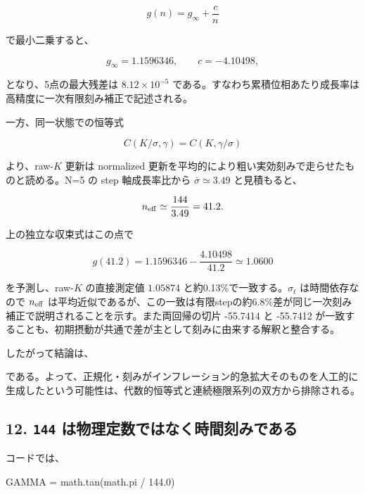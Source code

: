 \documentclass[
  a4paper,
]{ltjsarticle}
\newenvironment{Shaded}{}{}
\newcommand{\FloatTok}[1]{\textcolor[rgb]{0.25,0.63,0.44}{#1}}
\newcommand{\NormalTok}[1]{#1}
\newcommand{\OperatorTok}[1]{\textcolor[rgb]{0.40,0.40,0.40}{#1}}
\begin{document}
\[
g(n)=g_\infty+\frac{c}{n}
\]

で最小二乗すると、

\[
g_\infty=1.1596346,\qquad c=-4.10498,
\]

となり、5点の最大残差は \(8.12\times10^{-5}\)
である。すなわち累積位相あたり成長率は高精度に一次有限刻み補正で記述される。

一方、同一状態での恒等式

\[
C(K/\sigma,\gamma)=C(K,\gamma/\sigma)
\]

より、raw-\(K\) 更新は normalized
更新を平均的により粗い実効刻みで走らせたものと読める。N=5 の step
軸成長率比から \(\bar\sigma\simeq3.49\) と見積もると、

\[
n_{\rm eff}\simeq\frac{144}{3.49}=41.2.
\]

上の独立な収束式はこの点で

\[
g(41.2)=1.1596346-\frac{4.10498}{41.2}\simeq1.0600
\]

を予測し、raw-\(K\) の直接測定値 \(1.05874\)
と約0.13\%で一致する。\(\sigma_t\) は時間依存なので \(n_{\rm eff}\)
は平均近似であるが、この一致は有限stepの約6.8\%差が同じ一次刻み補正で説明されることを示す。また両回帰の切片
-55.7414 と -55.7412
が一致することも、初期摂動が共通で差が主として刻みに由来する解釈と整合する。

したがって結論は、

\begin{center}\end{center}

である。よって、正規化・刻みがインフレーション的急拡大そのものを人工的に生成したという可能性は、代数的恒等式と連続極限系列の双方から排除される。

\subsection{\texorpdfstring{12. \texttt{144}
は物理定数ではなく時間刻みである}{12. 144 は物理定数ではなく時間刻みである}}\label{ux306fux7269ux7406ux5b9aux6570ux3067ux306fux306aux304fux6642ux9593ux523bux307fux3067ux3042ux308b}

コードでは、

\begin{Shaded}
\begin{Highlighting}[]
\NormalTok{GAMMA }\OperatorTok{=}\NormalTok{ math.tan(math.pi }\OperatorTok{/} \FloatTok{144.0}\NormalTok{)}
\end{Highlighting}
\end{Shaded}
\end{document}
